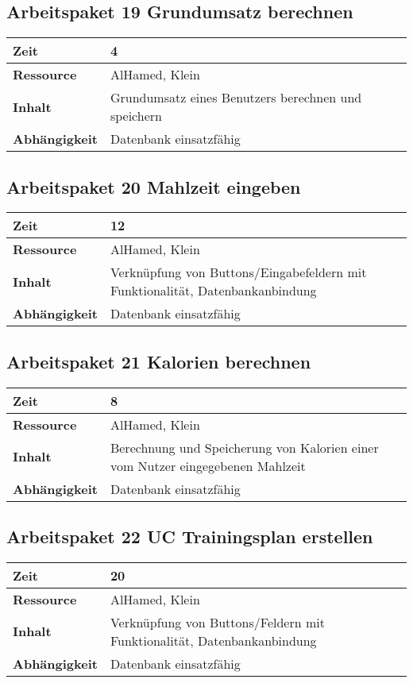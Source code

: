 \documentclass[12pt,a4paper,onecolumn]{article}
\begin{document}
\subsection{Arbeitspaket 19 Grundumsatz berechnen}
\begin{tabularx}{\textwidth}{|l|X|}
\hline
     \textbf{Zeit} & 4 \\
     \hline
     \textbf{Ressource} & AlHamed, Klein \\
     \hline
     \textbf{Inhalt} &  Grundumsatz eines Benutzers berechnen und speichern\\
     \hline
     \textbf{Abhängigkeit} & Datenbank einsatzfähig \\
\hline
\end{tabularx}

\subsection{Arbeitspaket 20 Mahlzeit eingeben}
\begin{tabularx}{\textwidth}{|l|X|}
\hline
     \textbf{Zeit} & 12 \\
     \hline
     \textbf{Ressource} & AlHamed, Klein\\
     \hline
     \textbf{Inhalt} &  Verknüpfung von Buttons/Eingabefeldern mit Funktionalität, Datenbankanbindung\\
     \hline
     \textbf{Abhängigkeit} & Datenbank einsatzfähig\\
\hline
\end{tabularx}

\subsection{Arbeitspaket 21 Kalorien berechnen}
\begin{tabularx}{\textwidth}{|l|X|}
\hline
     \textbf{Zeit} & 8 \\
     \hline
     \textbf{Ressource} & AlHamed, Klein \\
     \hline
     \textbf{Inhalt} &  Berechnung und Speicherung von Kalorien einer vom Nutzer eingegebenen Mahlzeit\\
     \hline
     \textbf{Abhängigkeit} & Datenbank einsatzfähig\\
\hline
\end{tabularx}

\subsection{Arbeitspaket 22 UC Trainingsplan erstellen}
\begin{tabularx}{\textwidth}{|l|X|}
\hline
     \textbf{Zeit} & 20 \\
     \hline
     \textbf{Ressource} & AlHamed, Klein \\
     \hline
     \textbf{Inhalt} &  Verknüpfung von Buttons/Feldern mit Funktionalität, Datenbankanbindung\\
     \hline
     \textbf{Abhängigkeit} & Datenbank einsatzfähig\\
\hline
\end{tabularx}
\end{document}
